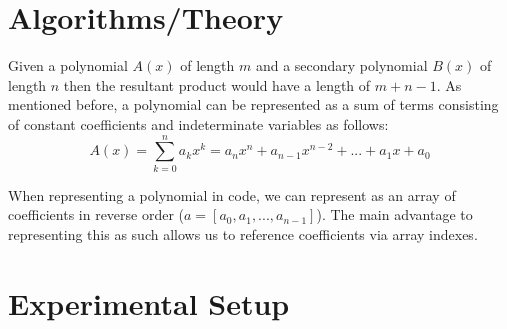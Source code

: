 \documentclass[12pt]{article}
\begin{document}
        \section{Algorithms/Theory}
        \indent\par{Given a polynomial $A(x)$ of length $m$ and a secondary polynomial $B(x)$ of length $n$ then the resultant product would have a length of $m+n-1$. As mentioned before, a polynomial can be represented as a sum of terms consisting of constant coefficients and indeterminate variables as follows: }
        $$A(x) = \sum_{k=0}^{n}a_kx^k = a_nx^n + a_{n-1}x^{n-2} + ... + a_1x + a_0$$
        \indent\par{When representing a polynomial in code, we can represent as an array of coefficients in reverse order ($a = [a_0,a_1,...,a_{n-1}]$). The main advantage to representing this as such allows us to reference coefficients via array indexes. }
        \section{Experimental Setup}
\end{document}
